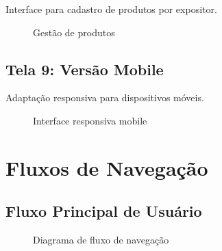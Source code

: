 \documentclass[12pt,a4paper]{article}
\begin{document}
Interface para cadastro de produtos por expositor.

\begin{figure}[H]
\centering
{}
\caption{Gestão de produtos}
\label{fig:gestao_produtos}
\end{figure}

\subsection{Tela 9: Versão Mobile}

Adaptação responsiva para dispositivos móveis.

\begin{figure}[H]
\centering
{}
\caption{Interface responsiva mobile}
\label{fig:mobile}
\end{figure}

\section{Fluxos de Navegação}

\subsection{Fluxo Principal de Usuário}

\begin{figure}[H]
\centering
{}
\caption{Diagrama de fluxo de navegação}
\label{fig:fluxo_navegacao}
\end{figure}
\end{document}
